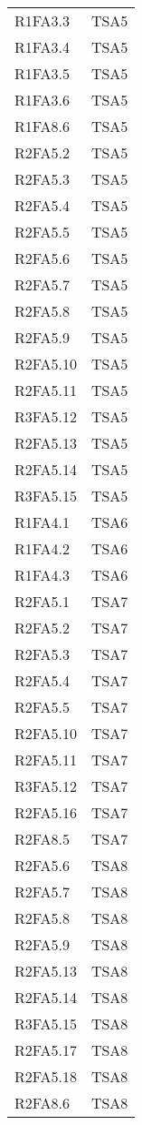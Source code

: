 {\begin{longtable}{C{4cm} C{4cm}}
R1FA3.3 & TSA5  \\
R1FA3.4 & TSA5  \\
R1FA3.5 & TSA5  \\
R1FA3.6 & TSA5  \\
R1FA8.6 & TSA5  \\
R2FA5.2 & TSA5  \\
R2FA5.3 & TSA5  \\
R2FA5.4 & TSA5  \\
R2FA5.5 & TSA5  \\
R2FA5.6 & TSA5  \\
R2FA5.7 & TSA5  \\
R2FA5.8 & TSA5  \\
R2FA5.9 & TSA5  \\
R2FA5.10 & TSA5  \\
R2FA5.11 & TSA5  \\
R3FA5.12 & TSA5  \\
R2FA5.13 & TSA5  \\
R2FA5.14 & TSA5  \\
R3FA5.15 & TSA5  \\

R1FA4.1 & TSA6  \\
R1FA4.2& TSA6  \\
R1FA4.3& TSA6  \\

R2FA5.1 & TSA7  \\
R2FA5.2 & TSA7  \\
R2FA5.3 & TSA7  \\
R2FA5.4 & TSA7  \\
R2FA5.5 & TSA7  \\
R2FA5.10 & TSA7  \\
R2FA5.11 & TSA7  \\
R3FA5.12 & TSA7  \\
R2FA5.16 & TSA7  \\
R2FA8.5 & TSA7  \\

R2FA5.6 & TSA8  \\
R2FA5.7 & TSA8  \\
R2FA5.8 & TSA8  \\
R2FA5.9 & TSA8  \\
R2FA5.13 & TSA8  \\
R2FA5.14 & TSA8  \\
R3FA5.15 & TSA8  \\
R2FA5.17 & TSA8  \\
R2FA5.18 & TSA8 \\
R2FA8.6 & TSA8  \\


\end{longtable}}
